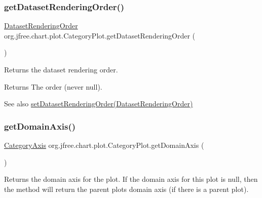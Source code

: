 \subsubsection{\texorpdfstring{get\+Dataset\+Rendering\+Order()}{getDatasetRenderingOrder()}}
{\footnotesize\ttfamily \mbox{\hyperlink{classorg_1_1jfree_1_1chart_1_1plot_1_1_dataset_rendering_order}{Dataset\+Rendering\+Order}} org.\+jfree.\+chart.\+plot.\+Category\+Plot.\+get\+Dataset\+Rendering\+Order (\begin{DoxyParamCaption}{ }\end{DoxyParamCaption})}

Returns the dataset rendering order.

\begin{DoxyReturn}{Returns}
The order (never {\ttfamily null}).
\end{DoxyReturn}
\begin{DoxySeeAlso}{See also}
\mbox{\hyperlink{classorg_1_1jfree_1_1chart_1_1plot_1_1_category_plot_a9aad5e87ec9423894584f64dd7badf5c}{set\+Dataset\+Rendering\+Order(\+Dataset\+Rendering\+Order)}} 
\end{DoxySeeAlso}
\mbox{\label{classorg_1_1jfree_1_1chart_1_1plot_1_1_category_plot_a18e5a481aee2fe569efaf4bc8abecd17}} 
\subsubsection{\texorpdfstring{get\+Domain\+Axis()}{getDomainAxis()}\hspace{0.1cm}{\footnotesize\ttfamily [1/2]}}
{\footnotesize\ttfamily \mbox{\hyperlink{classorg_1_1jfree_1_1chart_1_1axis_1_1_category_axis}{Category\+Axis}} org.\+jfree.\+chart.\+plot.\+Category\+Plot.\+get\+Domain\+Axis (\begin{DoxyParamCaption}{ }\end{DoxyParamCaption})}

Returns the domain axis for the plot. If the domain axis for this plot is {\ttfamily null}, then the method will return the parent plot\textquotesingle{}s domain axis (if there is a parent plot).

